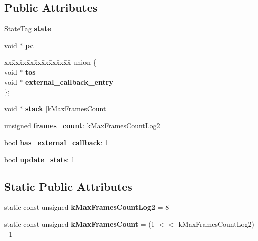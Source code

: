 \subsection*{Public Attributes}
\begin{DoxyCompactItemize}
\item 
\mbox{\label{structv8_1_1TickSample_a6ca7bd9445806b92b938eab2e700c324}} 
State\+Tag {\bfseries state}
\item 
\mbox{\label{structv8_1_1TickSample_a33cfc3082f836ce04dfcb97a3691f599}} 
void $\ast$ {\bfseries pc}
\item 
\mbox{\label{structv8_1_1TickSample_af5ce7424155dd71dd815c80f1b0f93f6}} 
\begin{tabbing}
xx\=xx\=xx\=xx\=xx\=xx\=xx\=xx\=xx\=\kill
union \{\\
\>void $\ast$ {\bfseries tos}\\
\>void $\ast$ {\bfseries external\_callback\_entry}\\
\}; \\

\end{tabbing}\item 
\mbox{\label{structv8_1_1TickSample_ae85c9bd6ff1da565d7e3066615a4d450}} 
void $\ast$ {\bfseries stack} \mbox{[}k\+Max\+Frames\+Count\mbox{]}
\item 
\mbox{\label{structv8_1_1TickSample_a00bfe6e03f75c291e220777fe74272d5}} 
unsigned {\bfseries frames\+\_\+count}\+: k\+Max\+Frames\+Count\+Log2
\item 
\mbox{\label{structv8_1_1TickSample_aa7c90f53d4ac6ab23727e21369f70b6e}} 
bool {\bfseries has\+\_\+external\+\_\+callback}\+: 1
\item 
\mbox{\label{structv8_1_1TickSample_aece17f054264917dcf20fd9ef0616930}} 
bool {\bfseries update\+\_\+stats}\+: 1
\end{DoxyCompactItemize}
\subsection*{Static Public Attributes}
\begin{DoxyCompactItemize}
\item 
\mbox{\label{structv8_1_1TickSample_a74b64cf598134b781b4ae1c65c31a70a}} 
static const unsigned {\bfseries k\+Max\+Frames\+Count\+Log2} = 8
\item 
\mbox{\label{structv8_1_1TickSample_a7f1b6ed32cd88d137e70d99adaa37d64}} 
static const unsigned {\bfseries k\+Max\+Frames\+Count} = (1 $<$$<$ k\+Max\+Frames\+Count\+Log2) -\/ 1
\end{DoxyCompactItemize}


